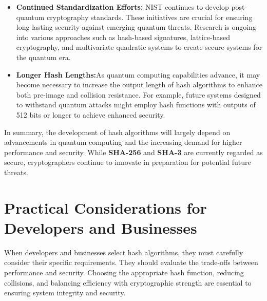 \documentclass[11pt,a4paper]{article}
\begin{document}
    \begin{itemize}
        \item \textbf{Continued Standardization Efforts:} NIST continues to develop post-quantum cryptography standards. These initiatives are crucial for ensuring long-lasting security against emerging quantum threats. Research is ongoing into various approaches such as hash-based signatures, lattice-based cryptography, and multivariate quadratic systems to create secure systems for the quantum era.

        \item \textbf{Longer Hash Lengths:}As quantum computing capabilities advance, it may become necessary to increase the output length of hash algorithms to enhance both pre-image and collision resistance. For example, future systems designed to withstand quantum attacks might employ hash functions with outputs of 512 bits or longer to achieve enhanced security.
        
    \end{itemize}
    In summary, the development of hash algorithms will largely depend on advancements in quantum computing and the increasing demand for higher performance and security. While \textbf{SHA-256} and \textbf{SHA-3} are currently regarded as secure, cryptographers continue to innovate in preparation for potential future threats.

\section*{Practical Considerations for Developers and Businesses}
When developers and businesses select hash algorithms, they must carefully consider their specific requirements. They should evaluate the trade-offs between performance and security. Choosing the appropriate hash function, reducing collisions, and balancing efficiency with cryptographic strength are essential to ensuring system integrity and security.
\end{document}
